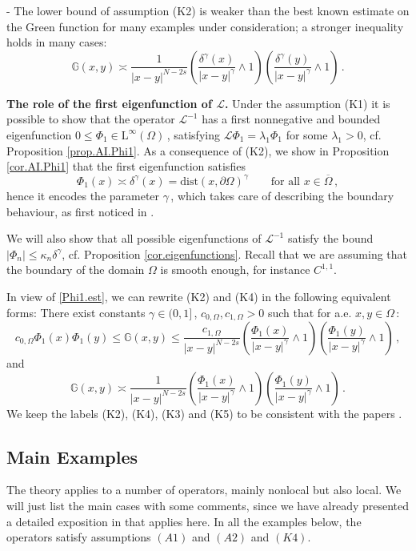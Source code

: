 \documentclass[11pt]{article}
\numberwithin{equation}{section}
\def\LL{\mathrm{L}} %
\newcommand{\A}{\mathcal{L}}
\newcommand{\AI}{\mathcal{L}^{-1}}
\newcommand{\p}{{\delta^\gamma}} %
\renewcommand{\k}{\kappa}
\newcommand{\K}{{\mathbb G}}
\def\dist{\mathrm{dist}} %
\begin{document}
\medskip

\noindent - The lower bound of assumption (K2) is weaker than the best known estimate on the Green function for many examples under consideration; a stronger inequality holds in many cases:
\[\tag{K4}
\K(x,y)\asymp \frac{1}{|x-y|^{N-2s}}
\left(\frac{\p(x)}{|x-y|^\gamma}\wedge 1\right)
\left(\frac{\p(y)}{|x-y|^\gamma}\wedge 1\right)\,.
\]

\noindent\textbf{The role of the first eigenfunction of $\A$. }Under the assumption (K1) it is possible to show that the operator $\AI$ has a first nonnegative and bounded eigenfunction $0\le \Phi_1\in\LL^\infty(\Omega)$\,, satisfying  $\A\Phi_1=\lambda_1\Phi_1$ for some $\lambda_1>0$, cf. Proposition  \ref{prop.AI.Phi1}. As a consequence of (K2), we show in Proposition \ref {cor.AI.Phi1} that the first eigenfunction satisfies
\begin{equation}\label{Phi1.est}
\Phi_1(x)\asymp \p(x)=\dist(x,\partial\Omega)^\gamma\qquad\mbox{for all }x\in \overline{\Omega}\,,
\end{equation}
hence it encodes the parameter $\gamma$\,, which takes care of describing the boundary behaviour, as first noticed in \cite{BV-PPR1}.

We will also show that all possible eigenfunctions  of $\AI$ satisfy the bound $|\Phi_n|\le \k_n \p$, cf. Proposition \ref{cor.eigenfunctions}.
Recall that we are assuming that the boundary of the domain $\Omega$ is smooth enough, for instance $C^{1,1}$.

In view of \eqref{Phi1.est}, we
can rewrite (K2) and (K4) in the following equivalent forms:  There exist constants $\gamma\in (0,1]$\,, $c_{0,\Omega},c_{1,\Omega}>0$ such that for a.e. $x,y\in \Omega$\,:
\[\tag{K3}
c_{0,\Omega}\Phi_1(x)\Phi_1(y)\le \K(x,y)\le \frac{c_{1,\Omega}}{|x-y|^{N-2s}}
\left(\frac{\Phi_1(x)}{|x-y|^\gamma}\wedge 1\right)
\left(\frac{\Phi_1(y)}{|x-y|^\gamma}\wedge 1\right)\,,
\]
and
\[\tag{K5}
\K(x,y)\asymp \frac{1}{|x-y|^{N-2s}}
\left(\frac{\Phi_1(x)}{|x-y|^\gamma}\wedge 1\right)
\left(\frac{\Phi_1(y)}{|x-y|^\gamma}\wedge 1\right)\,.
\]
We keep the labels (K2), (K4), (K3) and (K5) to be consistent with the papers \cite{BV-PPR2-1,BFV-Parabolic}.\vspace{-1mm}
%
\subsection{Main Examples}\vspace{-1mm}The theory applies to a number of operators, mainly nonlocal but also  local. We will just list the main cases with some comments, since we have already presented a detailed exposition in \cite{BV-PPR2-1, BFV-Parabolic} that applies here.
In all the examples below, the operators satisfy assumptions $(A1)$ and $(A2)$ and $(K4)$.
\end{document}
